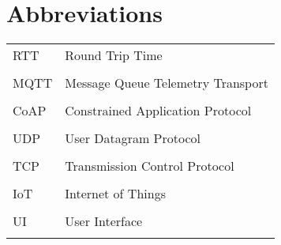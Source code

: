 \section*{Abbreviations}
\label{ch:abbreviations}

{}

\begin{table}[ht!]
    \begin{tabular}{l l}
        RTT & Round Trip Time \\\\
        MQTT & Message Queue Telemetry Transport \\\\
        CoAP & Constrained Application Protocol \\\\
        UDP & User Datagram Protocol  \\\\
        TCP & Transmission Control Protocol  \\\\
        IoT & Internet of Things  \\\\
        UI & User Interface  \\\\
    \end{tabular}
\end{table}
